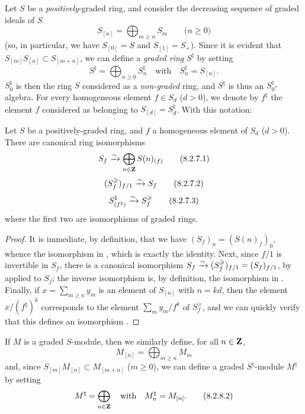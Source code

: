 \begin{env}[8.2.6]
\label{II.8.2.6}
Let $S$ be a \emph{positively}-graded ring, and consider the decreasing sequence of graded ideals of $S$
\[
\label{II.8.2.6.1}
  S_{[n]} = \bigoplus_{m\geq n} S_m
  \qquad\mbox{($n\geq0$)}
\tag{8.2.6.1}
\]
(so, in particular, we have $S_{[0]}=S$ and $S_{[1]}=S_+$).
Since it is evident that $S_{[m]}S_{[n]} \subset S_{[m+n]}$, we can define a \emph{graded ring} $S^\natural$ by setting
\[
\label{II.8.2.6.2}
  S^\natural = \bigoplus_{n\geq0} S_n^\natural
  \quad
  \text{with}
  \quad
  S_n^\natural = S_{[n]}.
\tag{8.2.6.2}
\]
$S_0^\natural$ is then the ring $S$ considered as a \emph{non-graded} ring, and $S^\natural$ is thus an $S_0^\natural$-algebra.
For every homogeneous element $f\in S_d$ ($d>0$), we denote by $f^\natural$ the element $f$ considered as belonging to $S_{[d]} = S_d^\natural$.
With this notation:
\end{env}

\begin{lemma}[8.2.7]
\label{II.8.2.7}
Let $S$ be a positively-graded ring, and $f$ a homogeneous element of $S_d$ ($d>0$).
There are canonical ring isomorphisms
\[
\label{II.8.2.7.1}
  S_f \xrightarrow{\sim} \bigoplus_{n\in\mathbf{Z}} S(n)_{(f)}
\tag{8.2.7.1}
\]
\[
\label{II.8.2.7.2}
  (S_f^\geqslant)_{f/1} \xrightarrow{\sim} S_f
\tag{8.2.7.2}
\]
\[
\label{II.8.2.7.3}
  S_{(f^\natural)}^\natural \xrightarrow{\sim} S_f^\geqslant
\tag{8.2.7.3}
\]
where the first two are isomorphisms of graded rings.
\end{lemma}

\begin{proof}
It is immediate, by definition, that we have $(S_f)_n = (S(n)_f)_0$, whence the isomorphism in , which is exactly the identity.
Next, since $f/1$ is invertible in $S_f$, there is a canonical isomorphism $S_f \xrightarrow{\sim} (S_f^\geqslant)_{f/1} = (S_f)_{f/1}$, by  applied to $S_f$;
the inverse isomorphism is, by definition, the isomorphism in .
Finally, if $x = \sum_{m\geq n}y_m$ is an element of $S_{[n]}$ with $n=kd$, then the element $x/(f^\natural)^k$ corresponds to the element $\sum_m y_m/f^k$ of $S_f^\geq$, and we can quickly verify that this defines an isomorphism .
\end{proof}

\begin{env}[8.2.8]
\label{II.8.2.8}
If $M$ is a graded $S$-module, then we similarly define, for all $n\in\mathbf{Z}$,
\[
\label{II.8.2.8.1}
  M_{[n]} = \bigoplus_{m\geq n} M_m
\tag{8.2.8.1}
\]
and, since $S_{[m]}M_{[n]} \subset M_{[m+n]}$ ($m\geq0$), we can define a graded $S^\natural$-module $M^\natural$ by setting
\[
\label{II.8.2.8.2}
  M^\natural = \bigoplus_{n\in\mathbf{Z}}
  \quad
  \text{with}
  \quad
  M_n^\natural = M_{[n]}.
\tag{8.2.8.2}
\]
\end{env}

